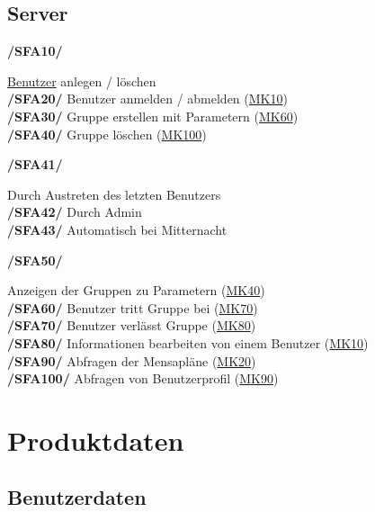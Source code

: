 \documentclass[a4paper]{scrreprt}
\begin{document}
\section{Server}

\begin{addmargin}[25pt]{0pt}
\hypertarget{sfa10}{\textbf{/SFA10/}} \hyperlink{benutzer}{Benutzer} anlegen / löschen\\
\hypertarget{sfa20}{\textbf{/SFA20/}} Benutzer anmelden / abmelden (\hyperlink{mk10}{MK10})\\
\hypertarget{sfa30}{\textbf{/SFA30/}} Gruppe erstellen mit Parametern (\hyperlink{mk60}{MK60})\\
\hypertarget{sfa40}{\textbf{/SFA40/}} Gruppe löschen (\hyperlink{mk100}{MK100})\\
	\begin{addmargin}[25pt]{0pt}
	\hypertarget{sfa41}{\textbf{/SFA41/}} Durch Austreten des letzten Benutzers\\
	\hypertarget{sfa42}{\textbf{/SFA42/}} Durch Admin\\
	\hypertarget{sfa43}{\textbf{/SFA43/}} Automatisch bei Mitternacht\\
	\end{addmargin}
\hypertarget{sfa50}{\textbf{/SFA50/}} Anzeigen der Gruppen zu Parametern (\hyperlink{m40}{MK40})\\
\hypertarget{sfa60}{\textbf{/SFA60/}} Benutzer tritt Gruppe bei (\hyperlink{m70}{MK70})\\
\hypertarget{sfa70}{\textbf{/SFA70/}} Benutzer verlässt Gruppe (\hyperlink{m80}{MK80})\\
\hypertarget{sfa80}{\textbf{/SFA80/}} Informationen bearbeiten von einem Benutzer (\hyperlink{m10}{MK10})\\
\hypertarget{sfa90}{\textbf{/SFA90/}} Abfragen der Mensapläne (\hyperlink{m20}{MK20})\\
\hypertarget{sfa100}{\textbf{/SFA100/}} Abfragen von Benutzerprofil (\hyperlink{m90}{MK90})\\
\end{addmargin}

\chapter{Produktdaten}

\section{Benutzerdaten}
\end{document}
